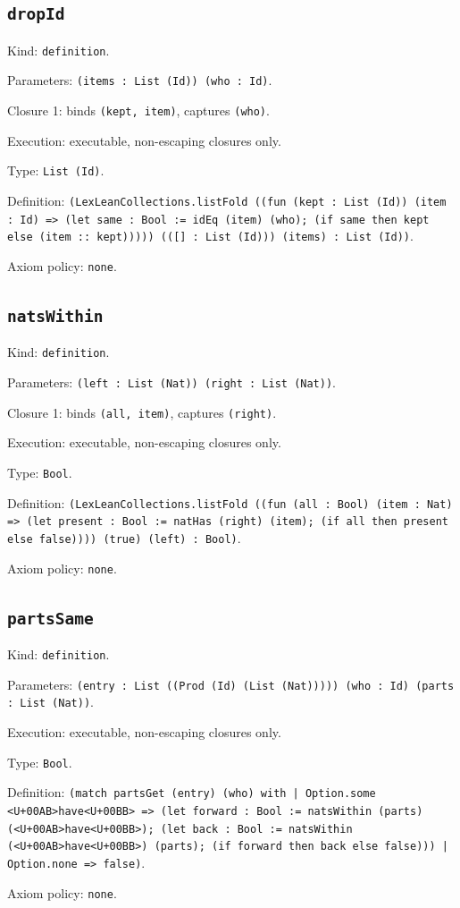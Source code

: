 \documentclass[11pt]{article}
\begin{document}
\subsection*{\texttt{dropId}}
\noindent Kind: \texttt{definition}.\par
\noindent Parameters: \texttt{(items : List (Id)) (who : Id)}.\par
\noindent Closure 1: binds \texttt{(kept, item)}, captures \texttt{(who)}.\par
\noindent Execution: executable, non-escaping closures only.\par
\noindent Type: \texttt{List (Id)}.\par
\noindent Definition: \texttt{(LexLeanCollections.listFold ((fun (kept : List (Id)) (item : Id) => (let same : Bool := idEq (item) (who); (if same then kept else (item :: kept))))) (([] : List (Id))) (items) : List (Id))}.\par
\noindent Axiom policy: \texttt{none}.\par
\subsection*{\texttt{natsWithin}}
\noindent Kind: \texttt{definition}.\par
\noindent Parameters: \texttt{(left : List (Nat)) (right : List (Nat))}.\par
\noindent Closure 1: binds \texttt{(all, item)}, captures \texttt{(right)}.\par
\noindent Execution: executable, non-escaping closures only.\par
\noindent Type: \texttt{Bool}.\par
\noindent Definition: \texttt{(LexLeanCollections.listFold ((fun (all : Bool) (item : Nat) => (let present : Bool := natHas (right) (item); (if all then present else false)))) (true) (left) : Bool)}.\par
\noindent Axiom policy: \texttt{none}.\par
\subsection*{\texttt{partsSame}}
\noindent Kind: \texttt{definition}.\par
\noindent Parameters: \texttt{(entry : List ((Prod (Id) (List (Nat))))) (who : Id) (parts : List (Nat))}.\par
\noindent Execution: executable, non-escaping closures only.\par
\noindent Type: \texttt{Bool}.\par
\noindent Definition: \texttt{(match partsGet (entry) (who) with | Option.some <U+00AB>have<U+00BB> => (let forward : Bool := natsWithin (parts) (<U+00AB>have<U+00BB>); (let back : Bool := natsWithin (<U+00AB>have<U+00BB>) (parts); (if forward then back else false))) | Option.none => false)}.\par
\noindent Axiom policy: \texttt{none}.\par
\end{document}
